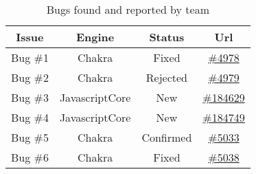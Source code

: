 \begin{table}[]
    \centering
    \caption{Bugs found and reported by  team}
    \label{tab:bugs}
    \begin{tabular}{|c|c|c|c|}
    \hline
    Issue    & Engine                                                          & Status                                                                            & \multicolumn{1}{c|}{Url}                                                                                                                      \\ \hline
    Bug \#1  & Chakra                                                          & Fixed                                                                             & \href{https://github.com/Microsoft/ChakraCore/issues/4978}{\#4978}                                                                                           \\ \hline
    Bug \#2  & Chakra                                                          & Rejected                                                                          & \href{https://github.com/Microsoft/ChakraCore/issues/4979}{\#4979}                                                                              \\ \hline
    Bug \#3  & JavascriptCore                                                  & New                                                                               & \href{https://bugs.webkit.org/show\_bug.cgi?id=184629}{\#184629}                                                                                               \\ \hline
    Bug \#4  & JavascriptCore                                                  & New                                                                               & \href{https://bugs.webkit.org/show\_bug.cgi?id=184749}{\#184749}                                                                                               \\ \hline
    Bug \#5  & Chakra                                                          & Confirmed                                                                         & \href{https://github.com/Microsoft/ChakraCore/issues/5033}{\#5033}                                                                                           \\ \hline
    Bug \#6  & Chakra                                                          & Fixed                                                                             & \href{https://github.com/Microsoft/ChakraCore/issues/5038}{\#5038}                                                                                           \\ \hline

\end{tabular}
\end{table}
